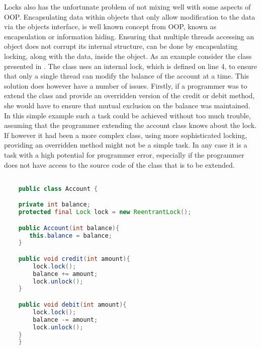Locks also has the unfortunate problem of not mixing well with some aspects of \ac{OOP}. Encapsulating data within objects that only allow modification to the data via the objects interface, is well known concept from \ac{OOP}, known as encapsulation or information hiding. Ensuring that multiple threads accessing an object does not corrupt its internal structure, can be done by encapsulating locking, along with the data, inside the object. As an example consider the  class presented in . The  class uses an internal lock, which is defined on line 4, to ensure that only a single thread can modify the balance of the account at a time. This solution does however have a number of issues. Firstly, if a programmer was to extend the  class and provide an overridden version of the credit or debit method, she would have to ensure that mutual exclusion on the balance was maintained. In this simple example such a task could be achieved without too much trouble, assuming that the programmer extending the account class knows about the lock. If however it had been a more complex class, using more sophisticated locking, providing an overridden method might not be a simple task. In any case it is a task with a high potential for programmer error, especially if the programmer does not have access to the source code of the class that is to be extended.

\begin{lstlisting}[float,label=lst:account_example,
  caption={Encapsulated locking},
  language=Java,  
  showspaces=false,
  showtabs=false,
  breaklines=true,
  showstringspaces=false,
  breakatwhitespace=true,
  commentstyle=\color{greencomments},
  keywordstyle=\color{bluekeywords},
  stringstyle=\color{redstrings}]  % Start your code-block

	public class Account {

    private int balance;
    protected final Lock lock = new ReentrantLock();

    public Account(int balance){
       this.balance = balance;
    }

    public void credit(int amount){
        lock.lock();
        balance += amount;
        lock.unlock();
    }

    public void debit(int amount){
        lock.lock();
        balance -= amount;
        lock.unlock();
    }
	}
\end{lstlisting}

